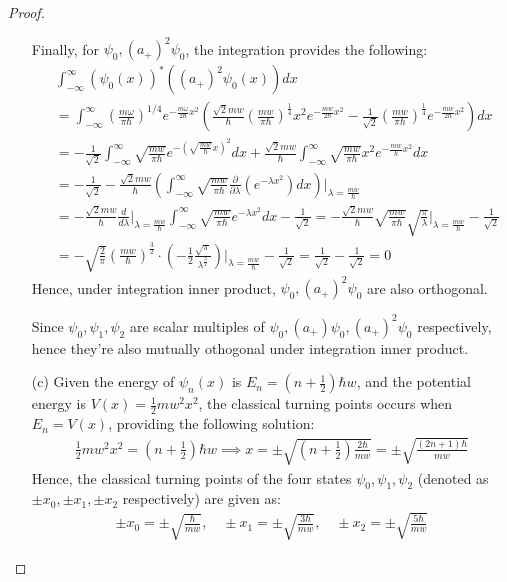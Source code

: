 \documentclass{article}
\begin{document}
\begin{proof}
\begin{itemize}
        Finally, for $\psi_0, (a_+)^2\psi_0$, the integration provides the following:
        \begin{align}
            &\int_{-\infty}^{\infty}(\psi_0(x))^*((a_+)^2\psi_0(x))dx\\
            &= \int_{-\infty}^{\infty}\left(\frac{m\omega}{\pi \hbar}\right)^{1/4} e^{- \frac{m\omega}{2\hbar}x^2}\left(\frac{\sqrt{2}mw}{\hbar}\left(\frac{mw}{\pi\hbar}\right)^\frac{1}{4}x^2e^{-\frac{mw}{2\hbar}x^2} - \frac{1}{\sqrt{2}}\left(\frac{mw}{\pi\hbar}\right)^\frac{1}{4}e^{-\frac{mw}{2\hbar}x^2}\right) dx\\
            &= -\frac{1}{\sqrt{2}}\int_{-\infty}^{\infty}\sqrt{\frac{mw}{\pi\hbar}}e^{-\left(\sqrt{\frac{mw}{\hbar}}x\right)^2}dx + \frac{\sqrt{2}mw}{\hbar}\int_{-\infty}^{\infty}\sqrt{\frac{mw}{\pi \hbar}}x^2 e^{-\frac{mw}{\hbar}x^2}dx\\
            &= -\frac{1}{\sqrt{2}} - \frac{\sqrt{2}mw}{\hbar}\left(\int_{-\infty}^{\infty}\sqrt{\frac{mw}{\pi \hbar}}\frac{\partial}{\partial \lambda}\left(e^{-\lambda x^2}\right)dx\right) \bigg|_{\lambda=\frac{mw}{\hbar}}\\
            &= -\frac{\sqrt{2}mw}{\hbar}\frac{d}{d\lambda}\bigg|_{\lambda=\frac{mw}{\hbar}}\int_{-\infty}^{\infty}\sqrt{\frac{mw}{\pi\hbar}}e^{-\lambda x^2}dx - \frac{1}{\sqrt{2}} = -\frac{\sqrt{2}mw}{\hbar}\sqrt{\frac{mw}{\pi\hbar}}\sqrt{\frac{\pi}{\lambda}}\bigg|_{\lambda=\frac{mw}{\hbar}} - \frac{1}{\sqrt{2}}\\
            &= -\sqrt{\frac{2}{\pi}}\left(\frac{mw}{\hbar}\right)^\frac{3}{2}\cdot\left(-\frac{1}{2}\frac{\sqrt{\pi}}{\lambda^\frac{3}{2}}\right)\bigg|_{\lambda=\frac{mw}{\hbar}} - \frac{1}{\sqrt{2}} = \frac{1}{\sqrt{2}}-\frac{1}{\sqrt{2}}=0
        \end{align}
        Hence, under integration inner product, $\psi_0, (a_+)^2\psi_0$ are also orthogonal.

        Since $\psi_0,\psi_1,\psi_2$ are scalar multiples of $\psi_0,(a_+)\psi_0,(a_+)^2\psi_0$ respectively, hence they're also mutually othogonal under integration inner product.

        \hfill

        \item[(c)] Given the energy of $\psi_n(x)$ is $E_n=\left(n+\frac{1}{2}\right)\hbar w$, and the potential energy is $V(x)=\frac{1}{2}mw^2 x^2$, the classical turning points occurs when $E_n=V(x)$, providing the following solution:
        \begin{align}
            \frac{1}{2}mw^2 x^2=\left(n+\frac{1}{2}\right)\hbar w \implies x = \pm\sqrt{\left(n+\frac{1}{2}\right)\frac{2\hbar}{mw}} = \pm\sqrt{\frac{(2n+1)\hbar}{mw}}
        \end{align}
        Hence, the classical turning points of the four states $\psi_0,\psi_1,\psi_2$ (denoted as $\pm x_0, \pm x_1, \pm x_2$ respectively) are given as:
        \begin{align}
            \pm x_0 = \pm\sqrt{\frac{\hbar}{mw}},\quad \pm x_1=\pm\sqrt{\frac{3\hbar}{mw}},\quad \pm x_2=\pm\sqrt{\frac{5\hbar}{mw}}
        \end{align}


\end{itemize}
\end{proof}
\end{document}
